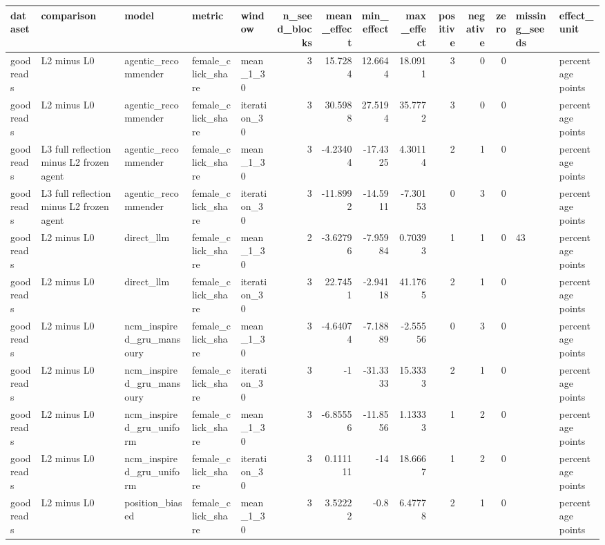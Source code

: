 \begin{table}[htbp!]
\centering
\small
\setlength{\tabcolsep}{3pt}
\renewcommand{\arraystretch}{1.1}
\begin{tabular}{lllllrrrrrrrll}
\hline
dataset & comparison & model & metric & window & n\_seed\_blocks & mean\_effect & min\_effect & max\_effect & positive & negative & zero & missing\_seeds & effect\_unit \\
\hline
goodreads & L2 minus L0 & agentic\_recommender & female\_click\_share & mean\_1\_30 & 3 & 15.7284 & 12.6644 & 18.0911 & 3 & 0 & 0 &  & percentage points \\
goodreads & L2 minus L0 & agentic\_recommender & female\_click\_share & iteration\_30 & 3 & 30.5988 & 27.5194 & 35.7772 & 3 & 0 & 0 &  & percentage points \\
goodreads & L3 full reflection minus L2 frozen agent & agentic\_recommender & female\_click\_share & mean\_1\_30 & 3 & -4.23404 & -17.4325 & 4.30114 & 2 & 1 & 0 &  & percentage points \\
goodreads & L3 full reflection minus L2 frozen agent & agentic\_recommender & female\_click\_share & iteration\_30 & 3 & -11.8992 & -14.5911 & -7.30153 & 0 & 3 & 0 &  & percentage points \\
goodreads & L2 minus L0 & direct\_llm & female\_click\_share & mean\_1\_30 & 2 & -3.62796 & -7.95984 & 0.70393 & 1 & 1 & 0 & 43 & percentage points \\
goodreads & L2 minus L0 & direct\_llm & female\_click\_share & iteration\_30 & 3 & 22.7451 & -2.94118 & 41.1765 & 2 & 1 & 0 &  & percentage points \\
goodreads & L2 minus L0 & ncm\_inspired\_gru\_mansoury & female\_click\_share & mean\_1\_30 & 3 & -4.64074 & -7.18889 & -2.55556 & 0 & 3 & 0 &  & percentage points \\
goodreads & L2 minus L0 & ncm\_inspired\_gru\_mansoury & female\_click\_share & iteration\_30 & 3 & -1 & -31.3333 & 15.3333 & 2 & 1 & 0 &  & percentage points \\
goodreads & L2 minus L0 & ncm\_inspired\_gru\_uniform & female\_click\_share & mean\_1\_30 & 3 & -6.85556 & -11.8556 & 1.13333 & 1 & 2 & 0 &  & percentage points \\
goodreads & L2 minus L0 & ncm\_inspired\_gru\_uniform & female\_click\_share & iteration\_30 & 3 & 0.111111 & -14 & 18.6667 & 1 & 2 & 0 &  & percentage points \\
goodreads & L2 minus L0 & position\_biased & female\_click\_share & mean\_1\_30 & 3 & 3.52222 & -0.8 & 6.47778 & 2 & 1 & 0 &  & percentage points \\

\end{tabular}
\end{table}
